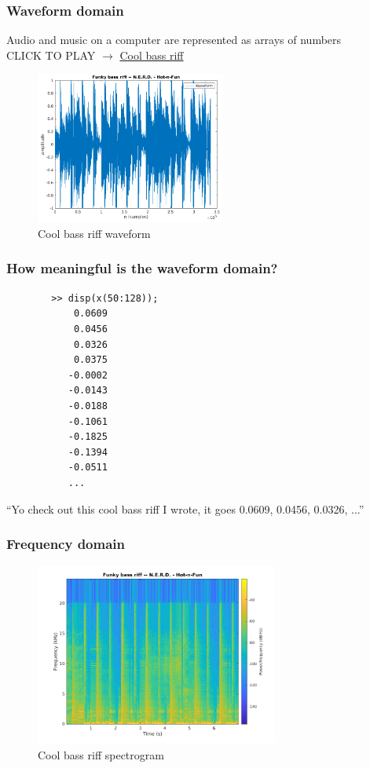\documentclass{beamer}
\begin{document}
\begin{frame}
	\frametitle{Waveform domain}
	Audio and music on a computer are represented as arrays of numbers\ \\
	CLICK TO PLAY $\rightarrow$ \href{run:./funkybass.wav}{Cool bass riff} \
	\begin{figure}
	\includegraphics[height=5cm]{./4_funkybass.png}
		\caption{Cool bass riff waveform}
	\end{figure}
\end{frame}

\begin{frame}[fragile]
	\frametitle{How meaningful is the waveform domain?}
	\begin{small}
	\begin{verbatim}
		>> disp(x(50:128));
		    0.0609
		    0.0456
		    0.0326
		    0.0375
		   -0.0002
		   -0.0143
		   -0.0188
		   -0.1061
		   -0.1825
		   -0.1394
		   -0.0511
		   ...
	\end{verbatim}
	\end{small}
	``Yo check out this cool bass riff I wrote, it goes 0.0609, 0.0456, 0.0326, ...''
\end{frame}

\begin{frame}
	\frametitle{Frequency domain}
	\begin{figure}
	\includegraphics[height=6cm]{./5_funkybass_spectrogram.png}
		\caption{Cool bass riff spectrogram}
	\end{figure}
\end{frame}
\end{document}
